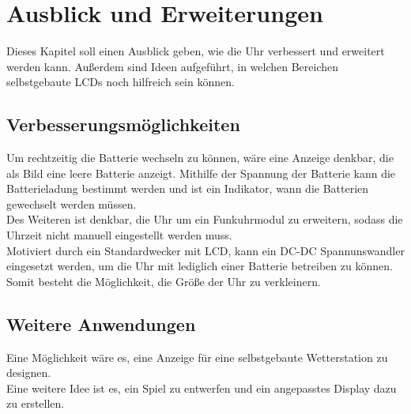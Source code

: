 \section{Ausblick und Erweiterungen}

Dieses Kapitel soll einen Ausblick geben, wie die Uhr verbessert und erweitert werden kann. Außerdem sind Ideen aufgeführt, in welchen Bereichen selbstgebaute LCDs noch hilfreich sein können.

\subsection{Verbesserungsmöglichkeiten}

Um rechtzeitig die Batterie wechseln zu können, wäre eine Anzeige denkbar, die als Bild eine leere Batterie anzeigt. Mithilfe der Spannung der Batterie kann die Batterieladung bestimmt werden und ist ein Indikator, wann die Batterien gewechselt werden müssen.\\

Des Weiteren ist denkbar, die Uhr um ein Funkuhrmodul zu erweitern, sodass die Uhrzeit nicht manuell eingestellt werden muss.\\

Motiviert durch ein Standardwecker mit LCD, kann ein DC-DC Spannunswandler eingesetzt werden, um die Uhr mit lediglich einer Batterie betreiben zu können. Somit besteht die Möglichkeit, die Größe der Uhr zu verkleinern.

\subsection{Weitere Anwendungen}

Eine Möglichkeit wäre es, eine Anzeige für eine selbstgebaute Wetterstation zu designen.\\

Eine weitere Idee ist es, ein Spiel zu entwerfen und ein angepasstes Display dazu zu erstellen.
